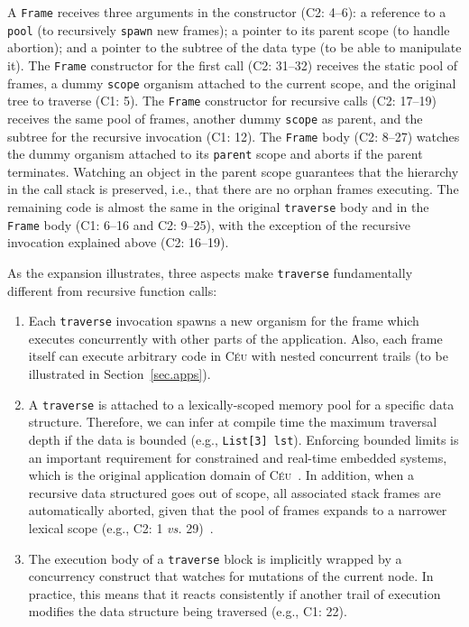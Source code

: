 \documentclass{sig-alternate}
\newcommand{\CEU}{\textsc{C\'{e}u}\xspace}
\newcommand{\code}[1] {{\small{\texttt{#1}}}}
\newcommand{\MM}[1] {\textcircled{\tiny{\textsf{#1}}}}
\begin{document}
A \code{Frame} receives three arguments in the constructor (\MM{C2}: 4--6):
a reference to a \code{pool} (to recursively \code{spawn} new frames);
a pointer to its parent scope (to handle abortion);
and a pointer to the subtree of the data type (to be able to manipulate it).
%
The \code{Frame} constructor for the first call (\MM{C2}: 31--32) receives the 
static pool of frames, a dummy \code{scope} organism attached to the current 
scope, and the original tree to traverse (\MM{C1}: 5).
%
The \code{Frame} constructor for recursive calls (\MM{C2}: 17--19) receives the 
same pool of frames, another dummy \code{scope} as parent, and the 
subtree for the recursive invocation (\MM{C1}: 12).
%
The \code{Frame} body (\MM{C2}: 8--27) watches the dummy organism attached to 
its \code{parent} scope and aborts if the parent terminates.
Watching an object in the parent scope guarantees that the hierarchy in the call stack 
is preserved, i.e., that there are no orphan frames executing.
%
The remaining code is almost the same in the original \code{traverse} body and 
in the \code{Frame} body (\MM{C1}: 6--16 and \MM{C2}: 9--25), with the 
exception of the recursive invocation explained above (\MM{C2}: 16--19).

As the expansion illustrates, three aspects make \code{traverse} fundamentally 
different from recursive function calls:
%
\begin{enumerate}
\item Each \code{traverse} invocation spawns a new organism for the frame which 
executes concurrently with other parts of the application.
Also, each frame itself can execute arbitrary code in \CEU with nested 
concurrent trails (to be illustrated in Section~\ref{sec.apps}).
%
\item A \code{traverse} is attached to a lexically-scoped memory pool for a 
specific data structure.
Therefore, we can infer at compile time the maximum traversal depth if the data 
is bounded (e.g., \code{List[3] lst}).
Enforcing bounded limits is an important requirement for constrained and 
real-time embedded systems, which is the original application domain of 
\CEU~\cite{ceu.sensys13}.
In addition, when a recursive data structured goes out of scope, all associated 
stack frames are automatically aborted, given that the pool of frames expands 
to a narrower lexical scope (e.g., \MM{C2}: 1 \emph{vs.} 29)~\cite{ceu.mod15}.
%
\item The execution body of a \code{traverse} block is implicitly wrapped by a 
concurrency construct that watches for mutations of the current node.
In practice, this means that it reacts consistently if another trail of 
execution modifies the data structure being traversed (e.g., \MM{C1}: 22).
\end{enumerate}
\end{document}
